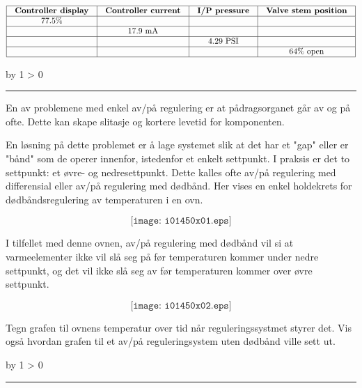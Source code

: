 \documentclass[12pt,a4paper]{article}
\def\oppgave{
            \advance\questnum by 1
            \ifnum \questnum > 0
                 \hrule
                 \vskip 3pt
                 \leftline{Oppgave \the\questnum}
                 \vskip 3pt \fi}
\begin{document}

$$\vbox{\offinterlineskip
\halign{\strut
\vrule \quad\hfil # \ \hfil & 
\vrule \quad\hfil # \ \hfil & 
\vrule \quad\hfil # \ \hfil & 
\vrule \quad\hfil # \ \hfil \vrule \cr
\noalign{\hrule}
%
{\bf Controller display} & {\bf Controller current} & {\bf I/P pressure} & {\bf Valve stem position} \cr
%
\noalign{\hrule}
%
77.5\% &  &  &  \cr
%
\noalign{\hrule}
%
 & 17.9 mA &  &  \cr
%
\noalign{\hrule}
%
 &  & 4.29 PSI &  \cr
%
\noalign{\hrule}
%
 &  &  & 64\% open \cr
%
\noalign{\hrule}
} %
}$$ %

\vskip 10pt \filbreak 
\oppgave{} 

En av problemene med enkel av/på regulering er at pådragsorganet går av og på ofte. Dette kan skape slitasje og kortere levetid for komponenten. 

En løsning på dette problemet er å lage systemet slik at det har et "gap" eller er "bånd" som de operer innenfor, istedenfor et enkelt settpunkt. I praksis er det to settpunkt: et øvre- og nedresettpunkt. Dette kalles ofte av/på regulering med differensial eller av/på regulering med dødbånd. Her vises en enkel holdekrets for dødbåndsregulering av temperaturen i en ovn. 

$$\texttt{[image: i01450x01.eps]}$$

I tilfellet med denne ovnen, av/på regulering med dødbånd vil si at varmeelementer ikke vil slå seg på før temperaturen kommer under nedre settpunkt, og det vil ikke slå seg av før temperaturen kommer over øvre settpunkt.

$$\texttt{[image: i01450x02.eps]}$$

Tegn grafen til ovnens temperatur over tid når reguleringssystmet styrer det. Vis også hvordan grafen til et av/på reguleringsystem uten dødbånd ville sett ut. 

\vskip 10pt \filbreak 
\oppgave{} 
\end{document}
